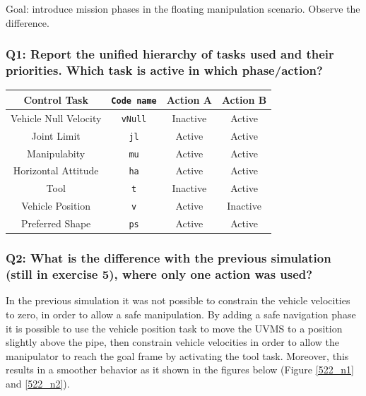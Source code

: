 \documentclass{article}
\begin{document}
Goal: introduce mission phases in the floating manipulation scenario. Observe the difference.

\subsubsection{Q1: Report the unified hierarchy of tasks used and their priorities. Which task is active in which phase/action?}

\begin{center}
\begin{tabular}{ | c | c | c | c |}
\hline
 Control Task & \texttt{Code name} & Action A & Action B \\
 \hline
 Vehicle Null Velocity & \texttt{vNull} & Inactive & Active \\
 Joint Limit & \texttt{jl} & Active & Active \\
 Manipulabity &  \texttt{mu} & Active & Active\\
 Horizontal Attitude &  \texttt{ha} & Active & Active \\
 Tool  &  \texttt{t} & Inactive & Active\\
 Vehicle Position &  \texttt{v} &Active & Inactive\\
 Preferred Shape & \texttt{ps} & Active & Active\\
 \hline
\end{tabular}
\end{center}

\subsubsection{Q2: What is the difference with the previous simulation (still in exercise 5), where only one action was used?}
In the previous simulation it was not possible to constrain the vehicle velocities to zero, in order to allow a safe manipulation. By adding a safe navigation phase it is possible to use the vehicle position task to move the UVMS to a position slightly above the pipe, then constrain vehicle velocities in order to allow the manipulator to reach the goal frame by activating the tool task. Moreover, this results in a smoother behavior as it shown in the figures below (Figure \ref{522_n1} and \ref{522_n2}).


\end{document}
